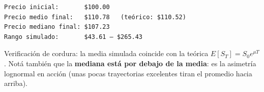 \documentclass[
  spanish,
  letterpaper,
  DIV=11,
  numbers=noendperiod]{scrreprt}
\newenvironment{Shaded}{\begin{snugshade}}{\end{snugshade}}
\newcommand{\BuiltInTok}[1]{\textcolor[rgb]{0.00,0.23,0.31}{#1}}
\newcommand{\DecValTok}[1]{\textcolor[rgb]{0.68,0.00,0.00}{#1}}
\newcommand{\NormalTok}[1]{\textcolor[rgb]{0.00,0.23,0.31}{#1}}
\newcommand{\OperatorTok}[1]{\textcolor[rgb]{0.37,0.37,0.37}{#1}}
\newcommand{\SpecialCharTok}[1]{\textcolor[rgb]{0.37,0.37,0.37}{#1}}
\newcommand{\SpecialStringTok}[1]{\textcolor[rgb]{0.13,0.47,0.30}{#1}}
\begin{document}
\begin{Shaded}
\end{Shaded}

\begin{verbatim}
Precio inicial:       $100.00
Precio medio final:   $110.78   (teórico: $110.52)
Precio mediano final: $107.23
Rango simulado:       $43.61 — $265.43
\end{verbatim}

Verificación de cordura: la media simulada coincide con la teórica
\(E[S_T] = S_0 e^{\mu T}\). Notá también que la \textbf{mediana está por
debajo de la media}: es la asimetría lognormal en acción (unas pocas
trayectorias excelentes tiran el promedio hacia arriba).
\end{document}
